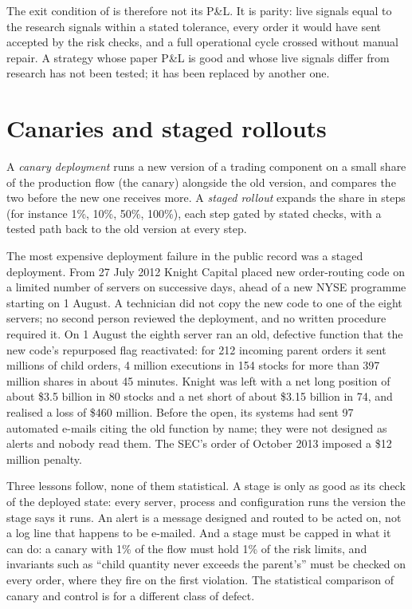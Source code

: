 The exit condition of  is therefore not its P\&L. It is parity: live signals equal to the research signals within a stated tolerance, every
order it would have sent accepted by the risk checks, and a full operational cycle crossed without manual repair. A strategy whose paper P\&L is good and
whose live signals differ from research has not been tested; it has been replaced by another one.

\section{Canaries and staged rollouts}

\begin{definition}\label{def:rs:live-experiments:canary}
A \emph{canary deployment} runs a new version of a trading component on a small share of the production flow (the canary) alongside
the old version, and compares the two before the new one receives more. A \emph{staged rollout} expands the share in steps (for instance
1\%, 10\%, 50\%, 100\%), each step gated by stated checks, with a tested path back to the old version at every step.
\end{definition}

The most expensive deployment failure in the public record was a staged deployment. From 27 July 2012 Knight Capital placed new order-routing code on a
limited number of servers on successive days, ahead of a new NYSE programme starting on 1 August. A technician did not copy the new code to one of the eight
servers; no second person reviewed the deployment, and no written procedure required it. On 1 August the eighth server ran an old, defective function that
the new code's repurposed flag reactivated: for 212 incoming parent orders it sent millions of child orders, 4 million executions in 154 stocks for more than
397 million shares in about 45 minutes. Knight was left with a net long position of about \$3.5 billion in 80 stocks and a net short of about \$3.15 billion in
74, and realised a loss of \$460 million. Before the open, its systems had sent 97 automated e-mails citing the old function by name; they were not designed as
alerts and nobody read them. The SEC's order of October 2013 imposed a \$12 million penalty.

Three lessons follow, none of them statistical. A stage is only as good as its check of the deployed state: every server, process and configuration runs the
version the stage says it runs. An alert is a message designed and routed to be acted on, not a log line that happens to be e-mailed. And a stage must be capped
in what it can do: a canary with 1\% of the flow must hold 1\% of the risk limits, and invariants such as ``child quantity never exceeds the parent's'' must be
checked on every order, where they fire on the first violation. The statistical comparison of canary and control is for a different class of defect.

